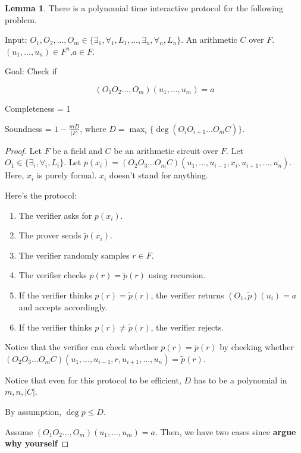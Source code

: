 \documentclass{article}
\theoremstyle{definition}
\newtheorem{lemma}[theorem]{Lemma}
\begin{document}
\begin{lemma}
    There is a polynomial time interactive protocol for the following problem.

    Input: $O_{1}, O_{2},...,O_{m} \in \{\exists_{1},\forall_{1},L_{1},...,\exists_{n},\forall_{n},L_{n}\}$. An arithmetic $C$ over $F$. $(u_{1},...,u_{n}) \in F^{n}$,$a \in F$. 

    Goal: Check if 

    \[ (O_{1}O_{2}...,O_{m})(u_{1},...,u_{m}) = a\]

    Completeness = 1

    Soundness = $1 - \frac{mD}{\lvert F \rvert}$, where $D = \max_{i}\{\deg (O_{i}O_{i+1}...O_{m}C)\}$.
\end{lemma}
\begin{proof}
    Let $F$ be a field and $C$ be an arithmetic circuit over $F$.
    Let $O_{1} \in \{\exists_{i}, \forall_{i}, L_{i} \}$.
    Let $p(x_{i}) = (O_{2}O_{3}...O_{m}C)(u_{1},...,u_{i-1},x_{i},u_{i+1}, ..., u_{n})$.
    Here, $x_{i}$ is purely formal. $x_{i}$ doesn't stand for anything.
    
    Here's the protocol:

    \begin{enumerate}
        \item The verifier asks for $p(x_{i})$.
        \item The prover sends $\tilde{p}(x_{i})$.
        \item The verifier randomly samples $r \in F$.
        \item The verifier checks $p(r) = \tilde{p}(r)$ using recursion.
        \item If the verifier thinks $p(r) = \tilde{p}(r)$, the verifier returns $(O_{1}, \tilde{p})(u_{i}) = a$ and accepts accordingly.
        \item If the verifier thinks $p(r) \neq \tilde{p}(r)$, the verifier rejects.
    \end{enumerate}

    Notice that the verifier can check whether $p(r) = \tilde{p}(r)$ by checking whether
    $(O_{2}O_{3}...O_{m}C)(u_{1},...,u_{i-1},r,u_{i+1}, ..., u_{n}) = \tilde{p}(r)$.



    Notice that even for this protocol to be efficient, $D$ has to be a polynomial in $m,n, \lvert C \rvert$.

    By assumption, $\deg{p} \leq D$.

    Assume $(O_{1}O_{2}...,O_{m})(u_{1},...,u_{m}) = a$. Then, we have two cases since \textbf{argue why yourself}


\end{proof}
\end{document}
